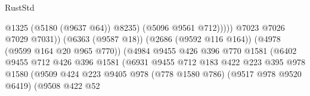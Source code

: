 \begin{lexlean}{RustStd}
\begin{coremodule}
                                                              @1325
                                                              (@5180 (@9637 @64))
                                                              @8235)
                                                            (@5096 @9561 @712)))))
                                                    @7023
                                                    @7026
                                                    @7029
                                                    @7031))
                                                (@6363 (@9587 @18))
                                                (@2686 (@9592 @116 @164))
                                                (@4978 (@9599 @164 @20 @965 @770))
                                                (@4984
                                                  @9455
                                                  @426
                                                  @396
                                                  @770
                                                  @1581
                                                  (@6402
                                                    @9455
                                                    @712
                                                    @426
                                                    @396
                                                    @1581
                                                    (@6931
                                                      @9455
                                                      @712
                                                      @183
                                                      @422
                                                      @223
                                                      @395
                                                      @978
                                                      @1580
                                                      (@9509
                                                        @424
                                                        @223
                                                        @9405
                                                        @978
                                                        (@778 @1580 @786)
                                                        (@9517 @978 @9520 @6419)
                                                        (@9508
                                                          @422
                                                          @52

\end{coremodule}
\end{lexlean}
